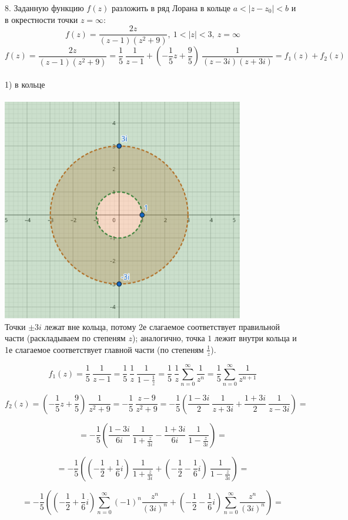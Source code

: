 \documentclass[14pt]{extarticle}
\begin{document}
8. Заданную функцию $f(z)$ разложить в ряд Лорана в кольце
$a < |z-z_0| < b$ и в окрестности точки $z=\infty$:
$$f(z)=\frac{2z}{(z-1)(z^2+9)}, \ 1<|z|<3, \ z=\infty$$
$$f(z)=\frac{2z}{(z-1)(z^2+9)}=\frac{1}{5} \ \frac{1}{z-1}+
\left(-\frac{1}{5}z+\frac{9}{5}\right) \ \frac{1}{(z-3i)(z+3i)}
= f_1(z)+f_2(z)$$ \\
1) в кольце \\\\
\includegraphics[width=300pt]{img4.png} \\
Точки $\pm 3i$ лежат вне кольца, потому 2е слагаемое соответствует
правильной части (раскладываем по степеням $z$); 
аналогично, точка $1$ лежит внутри кольца и 
1е слагаемое соответствует главной части (по степеням $\frac{1}{z}$). 

$$f_1(z) = \frac{1}{5} \ \frac{1}{z-1} = \frac{1}{5} \
\frac{1}{z} \ \frac{1}{1-\frac{1}{z}} = 
\frac{1}{5} \ \frac{1}{z} \sum_{n=0}^{\infty}\frac{1}{z^n} = 
\frac{1}{5} \sum_{n=0}^{\infty}\frac{1}{z^{n+1}} $$

$$f_2(z) = \left(-\frac{1}{5}z+\frac{9}{5}\right) \ \frac{1}{z^2+9}=
-\frac{1}{5} \ \frac{z-9}{z^2+9}=
-\frac{1}{5} 
\left(\frac{1-3i}{2} \ \frac{1}{z+3i} 
+ \frac{1+3i}{2} \ \frac{1}{z-3i}\right)=$$

$$= -\frac{1}{5} 
\left(\frac{1-3i}{6i} \ \frac{1}{1 + \frac{z}{3i}} 
- 
\frac{1+3i}{6i} \ \frac{1}{1 - \frac{z}{3i}}\right)=$$

$$= -\frac{1}{5} 
\left(\left(-\frac{1}{2}+\frac{1}{6}i\right) \ \frac{1}{1 + \frac{z}{3i}} 
+
\left(-\frac{1}{2}-\frac{1}{6}i\right) \ \frac{1}{1 - \frac{z}{3i}}\right)=$$

$$= -\frac{1}{5}
\left(\left(-\frac{1}{2}+\frac{1}{6}i\right)\sum_{n=0}^{\infty}(-1)^n
\frac{z^n}{(3i)^n}+\left(-\frac{1}{2}-\frac{1}{6}i\right)
\sum_{n=0}^{\infty}
\frac{z^n}{(3i)^n}\right)=$$
\end{document}
